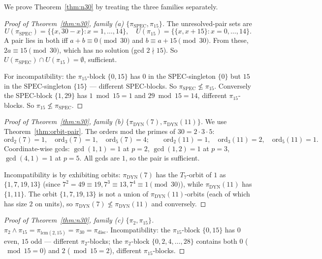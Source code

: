 \documentclass[11pt,reqno]{amsart}
\theoremstyle{plain}
\theoremstyle{definition}
\newcommand{\meet}{\wedge}
\newcommand{\disc}{\mathrm{disc}}
\newcommand{\DYN}{\mathrm{DYN}}
\newcommand{\SPEC}{\mathrm{SPEC}}
\newcommand{\ord}{\mathrm{ord}}
\newcommand{\lcm}{\mathrm{lcm}}
\begin{document}
We prove Theorem~\ref{thm:n30} by treating the three families separately.

\begin{proof}[Proof of Theorem~\ref{thm:n30}, family (a) $\{\pi_{\SPEC}, \pi_{15}\}$]
The unresolved-pair sets are
\[
U(\pi_{\SPEC}) = \{\{x, 30-x\} : x = 1, \ldots, 14\}, \quad U(\pi_{15}) = \{\{x, x+15\} : x = 0, \ldots, 14\}.
\]
A pair lies in both iff $a + b \equiv 0 \pmod{30}$ and $b \equiv a + 15 \pmod{30}$. From these, $2a \equiv 15 \pmod{30}$, which has no solution (gcd $2 \nmid 15$). So $U(\pi_{\SPEC}) \cap U(\pi_{15}) = \emptyset$, sufficient.

For incompatibility: the $\pi_{15}$-block $\{0,15\}$ has $0$ in the $\SPEC$-singleton $\{0\}$ but $15$ in the $\SPEC$-singleton $\{15\}$ --- different $\SPEC$-blocks. So $\pi_{\SPEC} \not\leq \pi_{15}$. Conversely the $\SPEC$-block $\{1,29\}$ has $1 \bmod 15 = 1$ and $29 \bmod 15 = 14$, different $\pi_{15}$-blocks. So $\pi_{15} \not\leq \pi_{\SPEC}$.
\end{proof}

\begin{proof}[Proof of Theorem~\ref{thm:n30}, family (b) $\{\pi_{\DYN}(7), \pi_{\DYN}(11)\}$]
We use Theorem~\ref{thm:orbit-pair}. The orders mod the primes of $30 = 2 \cdot 3 \cdot 5$:
\[
\ord_2(7) = 1,\quad \ord_3(7) = 1,\quad \ord_5(7) = 4; \qquad
\ord_2(11) = 1,\quad \ord_3(11) = 2,\quad \ord_5(11) = 1.
\]
Coordinate-wise gcds: $\gcd(1,1) = 1$ at $p=2$, $\gcd(1,2) = 1$ at $p=3$, $\gcd(4,1) = 1$ at $p=5$. All gcds are $1$, so the pair is sufficient.

Incompatibility is by exhibiting orbits: $\pi_{\DYN}(7)$ has the $T_7$-orbit of $1$ as $\{1,7,19,13\}$ (since $7^2 = 49 \equiv 19, 7^3 \equiv 13, 7^4 \equiv 1 \pmod{30}$), while $\pi_{\DYN}(11)$ has $\{1,11\}$. The orbit $\{1,7,19,13\}$ is not a union of $\pi_{\DYN}(11)$-orbits (each of which has size $2$ on units), so $\pi_{\DYN}(7) \not\leq \pi_{\DYN}(11)$ and conversely.
\end{proof}

\begin{proof}[Proof of Theorem~\ref{thm:n30}, family (c) $\{\pi_2, \pi_{15}\}$]
$\pi_2 \meet \pi_{15} = \pi_{\lcm(2,15)} = \pi_{30} = \pi_{\disc}$. Incompatibility: the $\pi_{15}$-block $\{0,15\}$ has $0$ even, $15$ odd --- different $\pi_2$-blocks; the $\pi_2$-block $\{0,2,4,\ldots,28\}$ contains both $0$ ($\bmod 15 = 0$) and $2$ ($\bmod 15 = 2$), different $\pi_{15}$-blocks.
\end{proof}
\end{document}
